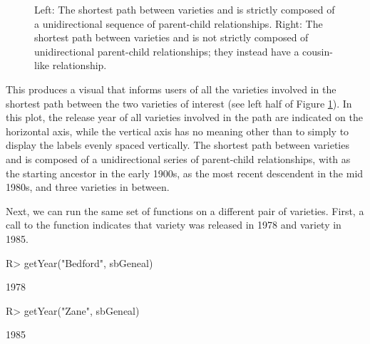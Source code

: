 \documentclass[article,shortnames]{jss}
\begin{document}
\begin{figure}[h]
    \centering
    \caption{Left: The shortest path between varieties  and  is strictly composed of a unidirectional sequence of parent-child relationships. Right: The shortest path between varieties  and  is not strictly composed of unidirectional parent-child relationships; they instead have a cousin-like relationship.}
    \label{fig:pathTNZB}
\end{figure}

This produces a visual that informs users of all the varieties involved in the shortest path between the two varieties of interest (see left half of Figure \ref{fig:pathTNZB}). In this plot, the release year of all varieties involved in the path are indicated on the horizontal axis, while the vertical axis has no meaning other than to simply to display the labels evenly spaced vertically. The shortest path between varieties  and  is composed of a unidirectional series of parent-child relationships, with  as the starting ancestor in the early 1900s,  as the most recent descendent in the mid 1980s, and three varieties in between.

Next, we can run the same set of functions on a different pair of varieties. First, a call to the  function  indicates that variety  was released in 1978 and variety  in 1985.

\begin{CodeChunk}
\begin{CodeInput}
R> getYear("Bedford", sbGeneal)
\end{CodeInput}
\begin{CodeOutput}
[1] 1978
\end{CodeOutput}
\begin{CodeInput}
R> getYear("Zane", sbGeneal)
\end{CodeInput}
\begin{CodeOutput}
[1] 1985
\end{CodeOutput}
\end{CodeChunk}
\end{document}
